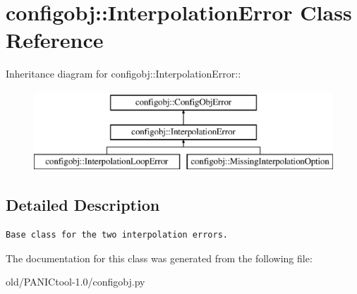 \section{configobj::Interpolation\-Error Class Reference}
\label{classconfigobj_1_1InterpolationError}
Inheritance diagram for configobj::Interpolation\-Error::\begin{figure}[H]
\begin{center}
\leavevmode
\includegraphics[height=3cm]{classconfigobj_1_1InterpolationError}
\end{center}
\end{figure}


\subsection{Detailed Description}


\footnotesize\begin{verbatim}Base class for the two interpolation errors.\end{verbatim}
\normalsize
 



The documentation for this class was generated from the following file:\begin{CompactItemize}
\item 
old/PANICtool-1.0/configobj.py\end{CompactItemize}
